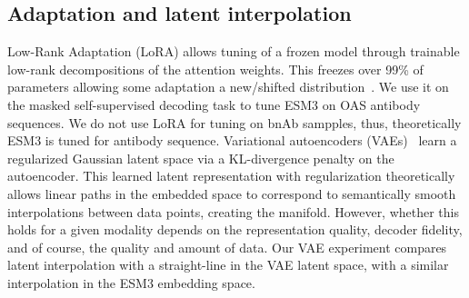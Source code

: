 \subsection{Adaptation and latent interpolation}
Low-Rank Adaptation (LoRA) allows tuning of a frozen model through trainable low-rank
decompositions of the attention weights.
This freezes over 99\% of parameters allowing 
some adaptation a new/shifted distribution~\cite{hu2022lora}. 
We use it on the masked self-supervised decoding task to 
tune ESM3 on 
OAS antibody sequences. We do not use LoRA for tuning on bnAb sampples,
thus, theoretically ESM3 is tuned for antibody sequence.
Variational
autoencoders (VAEs)~\cite{kingma2014vae} learn a regularized Gaussian 
latent space via a KL-divergence penalty on the autoencoder.
This learned latent representation with regularization
theoretically allows linear paths in the embedded space to correspond to 
semantically smooth interpolations between data points, creating the manifold.
However, whether this holds for a given modality depends on the representation quality,
decoder fidelity, and of course, the quality and amount of data.
Our VAE experiment compares latent interpolation with a straight-line in the
VAE latent space, with a similar interpolation in the 
ESM3 embedding space.